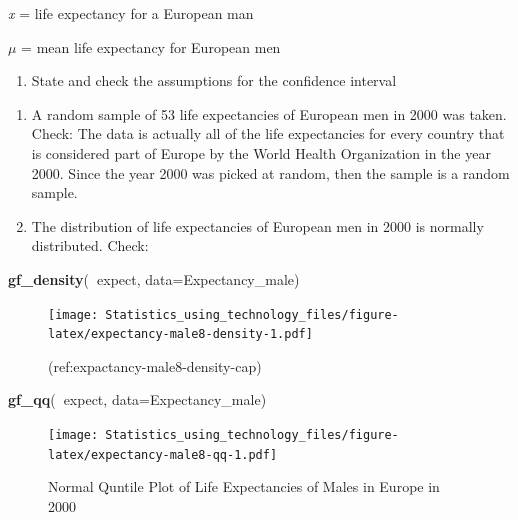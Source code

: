 \documentclass[
]{book}
\newenvironment{Shaded}{\begin{snugshade}}{\end{snugshade}}
\newcommand{\DataTypeTok}[1]{\textcolor[rgb]{0.13,0.29,0.53}{#1}}
\newcommand{\KeywordTok}[1]{\textcolor[rgb]{0.13,0.29,0.53}{\textbf{#1}}}
\newcommand{\NormalTok}[1]{#1}
\newcommand{\OperatorTok}[1]{\textcolor[rgb]{0.81,0.36,0.00}{\textbf{#1}}}
\providecommand{\tightlist}{%
  \setlength{\itemsep}{0pt}\setlength{\parskip}{0pt}}
\begin{document}
\emph{x} = life expectancy for a European man

\(\mu\) = mean life expectancy for European men

\begin{enumerate}
\def\labelenumi{\arabic{enumi}.}
\setcounter{enumi}{1}
\tightlist
\item
  State and check the assumptions for the confidence interval
\end{enumerate}

\begin{enumerate}
\def\labelenumi{\alph{enumi}.}
\item
  A random sample of 53 life expectancies of European men in 2000 was taken. Check: The data is actually all of the life expectancies for every country that is considered part of Europe by the World Health Organization in the year 2000. Since the year 2000 was picked at random, then the sample is a random sample.
\item
  The distribution of life expectancies of European men in 2000 is normally distributed. Check:
\end{enumerate}



\begin{Shaded}
\begin{Highlighting}[]
\KeywordTok{gf_density}\NormalTok{(}\OperatorTok{~}\NormalTok{expect, }\DataTypeTok{data=}\NormalTok{Expectancy_male)}
\end{Highlighting}
\end{Shaded}

\begin{figure}
\centering
\texttt{[image: Statistics\_using\_technology\_files/figure-latex/expectancy-male8-density-1.pdf]}
\caption{\label{fig:expectancy-male8-density}(ref:expactancy-male8-density-cap)}
\end{figure}



\begin{Shaded}
\begin{Highlighting}[]
\KeywordTok{gf_qq}\NormalTok{(}\OperatorTok{~}\NormalTok{expect, }\DataTypeTok{data=}\NormalTok{Expectancy_male)}
\end{Highlighting}
\end{Shaded}

\begin{figure}
\centering
\texttt{[image: Statistics\_using\_technology\_files/figure-latex/expectancy-male8-qq-1.pdf]}
\caption{\label{fig:expectancy-male8-qq}Normal Quntile Plot of Life Expectancies of Males in Europe in 2000}
\end{figure}
\end{document}
